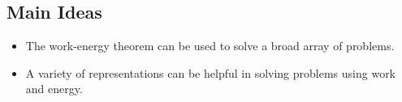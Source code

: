 \documentclass[]{article}
\begin{document}
\newpage
\begin{TeacherMargin}
	
\end{TeacherMargin}
\begin{PresentSpace}
\section*{Main Ideas}
\begin{itemize}
	\item The work-energy theorem can be used to solve a broad array of problems.
	\item A variety of representations can be helpful in solving problems using work and energy.
\end{itemize}
\end{PresentSpace}
\end{document}
